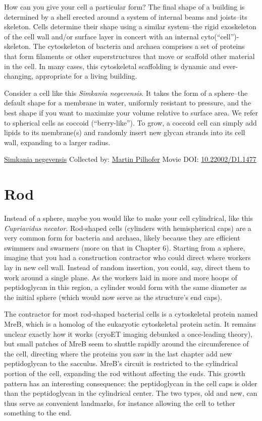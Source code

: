 \documentclass[]{tufte-book}
\begin{document}
How can you give your cell a particular form? The final shape of a building is determined by a shell erected around a system of internal beams and joists--its skeleton. Cells determine their shape using a similar system--the rigid exoskeleton of the cell wall and/or surface layer in concert with an internal cyto(``cell'')-skeleton. The cytoskeleton of bacteria and archaea comprises a set of proteins that form filaments or other superstructures that move or scaffold other material in the cell. In many cases, this cytoskeletal scaffolding is dynamic and ever-changing, appropriate for a living building.

Consider a cell like this \emph{Simkania negevensis}. It takes the form of a sphere--the default shape for a membrane in water, uniformly resistant to pressure, and the best shape if you want to maximize your volume relative to surface area. We refer to spherical cells as coccoid (``berry-like''). To grow, a coccoid cell can simply add lipids to its membrane(s) and randomly insert new glycan strands into its cell wall, expanding to a larger radius.



\hypertarget{htmlwidget-14f7c5d6817c53e90e13}{}

\label{fig:3-1}\protect\hyperlink{tree}{Simkania negevensis} Collected by: \protect\hyperlink{martin_pilhofer}{Martin Pilhofer} Movie DOI: \href{https://doi.org/10.22002/D1.1477}{10.22002/D1.1477}

\hypertarget{rod}{%
\section{Rod}\label{rod}}

Instead of a sphere, maybe you would like to make your cell cylindrical, like this \emph{Cupriavidus necator}. Rod-shaped cells (cylinders with hemispherical caps) are a very common form for bacteria and archaea, likely because they are efficient swimmers and swarmers (more on that in Chapter 6). Starting from a sphere, imagine that you had a construction contractor who could direct where workers lay in new cell wall. Instead of random insertion, you could, say, direct them to work around a single plane. As the workers laid in more and more hoops of peptidoglycan in this region, a cylinder would form with the same diameter as the initial sphere (which would now serve as the structure's end caps).

The contractor for most rod-shaped bacterial cells is a cytoskeletal protein named MreB, which is a homolog of the eukaryotic cytoskeletal protein actin. It remains unclear exactly how it works (cryoET imaging debunked a once-leading theory), but small patches of MreB seem to shuttle rapidly around the circumference of the cell, directing where the proteins you saw in the last chapter add new peptidoglycan to the sacculus. MreB's circuit is restricted to the cylindrical portion of the cell, expanding the rod without affecting the ends. This growth pattern has an interesting consequence: the peptidoglycan in the cell caps is older than the peptidoglycan in the cylindrical center. The two types, old and new, can thus serve as convenient landmarks, for instance allowing the cell to tether something to the end.
\end{document}
